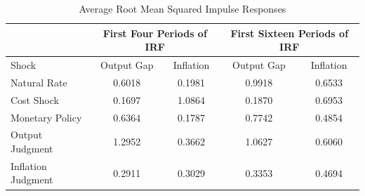 \documentclass[10pt]{article}
\begin{document}
{\begin{table}\caption{Average Root Mean Squared Impulse Responses}\label{tb:averms}
\begin{center}
\begin{tabular}{l|c|c||c|c}
 \multicolumn{1}{c}{} & \multicolumn{2}{c||}{First Four Periods of IRF} & \multicolumn{2}{c}{First Sixteen Periods of IRF} \\ \hline
 Shock & Output Gap & Inflation & Output Gap & Inflation \\ \hline 
Natural Rate & 0.6018 & 0.1981 & 0.9918 & 0.6533 \\ 
Cost Shock & 0.1697 & 1.0864 & 0.1870 & 0.6953 \\ 
Monetary Policy & 0.6364 & 0.1787 & 0.7742 & 0.4854 \\ 
Output Judgment & 1.2952 & 0.3662 & 1.0627 & 0.6060 \\ 
Inflation Judgment & 0.2911 & 0.3029 & 0.3353 & 0.4694 \\ 
\hline
\end{tabular}
\end{center}
\end{table}


}
\end{document}
